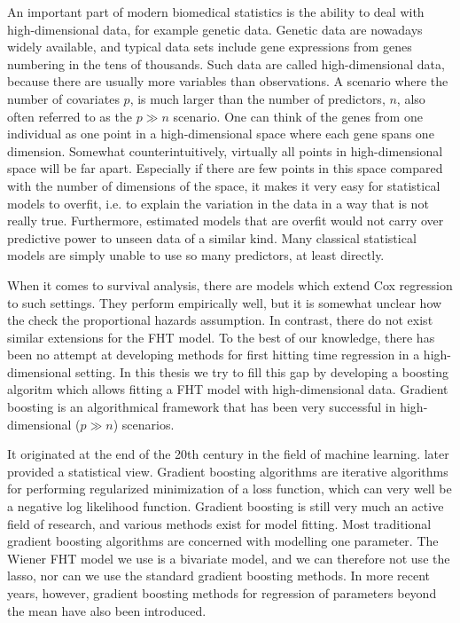 An important part of modern biomedical statistics is the ability to deal with high-dimensional data, for example genetic data.
Genetic data are nowadays widely available, and typical data sets include gene expressions from genes numbering in the tens of thousands.
Such data are called high-dimensional data, because there are usually more variables than observations.
A scenario where the number of covariates $p$, is much larger than the number of predictors, $n$, also often referred to as the $p\gg n$ scenario.
One can think of the genes from one individual as one point in a high-dimensional space where each gene spans one dimension.
Somewhat counterintuitively, virtually all points in high-dimensional space will be far apart.
Especially if there are few points in this space compared with the number of dimensions of the space, it makes it very easy for statistical models to overfit, i.e. to explain the variation in the data in a way that is not really true.
Furthermore, estimated models that are overfit would not carry over predictive power to unseen data of a similar kind.
Many classical statistical models are simply unable to use so many predictors, at least directly.

When it comes to survival analysis, there are models which extend Cox regression to such settings.
They perform empirically well, but it is somewhat unclear how the check the proportional hazards assumption.
In contrast, there do not exist similar extensions for the FHT model.
To the best of our knowledge, there has been no attempt at developing methods for first hitting time regression in a high-dimensional setting.
In this thesis we try to fill this gap by developing a boosting algoritm which allows fitting a FHT model with high-dimensional data.
Gradient boosting is an algorithmical framework that has been very successful in high-dimensional ($p\gg n$) scenarios.

It originated at the end of the 20th century in the field of machine learning.
\citet{friedman2001} later provided a statistical view.
Gradient boosting algorithms are iterative algorithms for performing regularized minimization of a loss function, which can very well be a negative log likelihood function.
Gradient boosting is still very much an active field of research, and various methods exist for model fitting.
Most traditional gradient boosting algorithms are concerned with modelling one parameter.
The Wiener FHT model we use is a bivariate model, and we can therefore not use the lasso, nor can we use the standard gradient boosting methods.
In more recent years, however, gradient boosting methods for regression of parameters beyond the mean have also been introduced.

